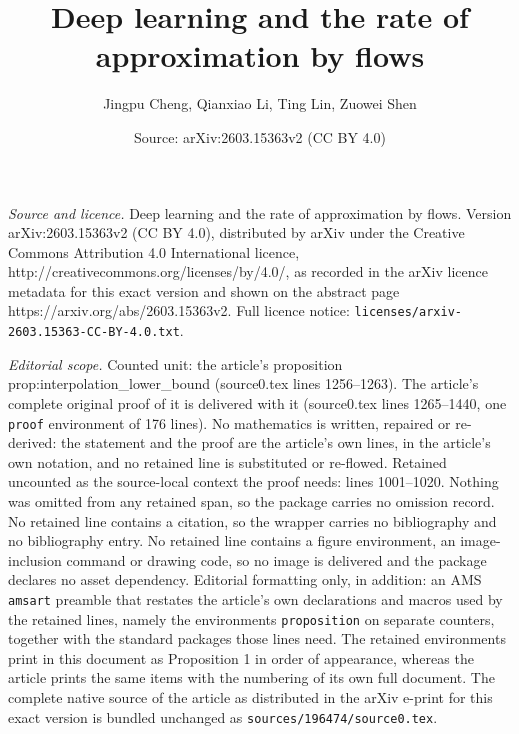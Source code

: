 \documentclass[10pt,a4paper]{amsart}
\title{Deep learning and the rate of approximation by flows}
\author{Jingpu Cheng, Qianxiao Li, Ting Lin, Zuowei Shen}
\date{Source: arXiv:2603.15363v2 (CC BY 4.0)}
\begin{document}
\maketitle

\noindent\emph{Source and licence.} Deep learning and the rate of approximation by flows. Version arXiv:2603.15363v2 (CC BY 4.0), distributed by arXiv under the Creative Commons Attribution 4.0 International licence, http://creativecommons.org/licenses/by/4.0/, as recorded in the arXiv licence metadata for this exact version and shown on the abstract page https://arxiv.org/abs/2603.15363v2. Full licence notice: \texttt{licenses/arxiv-2603.15363-CC-BY-4.0.txt}.\par\smallskip

\noindent\textit{Editorial scope.} Counted unit: the article's proposition prop:interpolation\_lower\_bound (source0.tex lines 1256--1263). The article's complete original proof of it is delivered with it (source0.tex lines 1265--1440, one \texttt{proof} environment of 176 lines). No mathematics is written, repaired or re-derived: the statement and the proof are the article's own lines, in the article's own notation, and no retained line is substituted or re-flowed.  Retained uncounted as the source-local context the proof needs: lines 1001--1020.  Nothing was omitted from any retained span, so the package carries no omission record.  No retained line contains a citation, so the wrapper carries no bibliography and no bibliography entry.  No retained line contains a figure environment, an image-inclusion command or drawing code, so no image is delivered and the package declares no asset dependency.  Editorial formatting only, in addition: an AMS \texttt{amsart} preamble that restates the article's own declarations and macros used by the retained lines, namely the environments \texttt{proposition} on separate counters, together with the standard packages those lines need.  The retained environments print in this document as Proposition 1 in order of appearance, whereas the article prints the same items with the numbering of its own full document.  The complete native source of the article as distributed in the arXiv e-print for this exact version is bundled unchanged as \texttt{sources/196474/source0.tex}.
\end{document}
